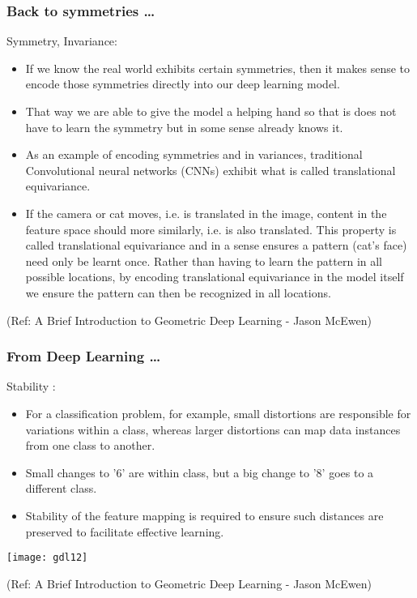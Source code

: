 \begin{frame}[fragile]\frametitle{Back to symmetries \ldots}

Symmetry, Invariance:

\begin{itemize}
\item If we know the real world exhibits certain symmetries, then it makes sense to encode those symmetries directly into our deep learning model.
\item That way we are able to give the model a helping hand so that is does not have to learn the symmetry but in some sense already knows it.
\item As an example of encoding symmetries and in variances, traditional Convolutional neural networks (CNNs) exhibit what is called translational equivariance.
\item If the camera or cat moves, i.e. is translated in the image, content in the feature space should more similarly, i.e. is also translated. This property is called translational equivariance and in a sense ensures a pattern (cat’s face) need only be learnt once. Rather than having to learn the pattern in all possible locations, by encoding translational equivariance in the model itself we ensure the pattern can then be recognized in all locations.
\end{itemize}

{\tiny (Ref: A Brief Introduction to Geometric Deep Learning - Jason McEwen)}

\end{frame}

\begin{frame}[fragile]\frametitle{From Deep Learning \ldots}

Stability :

\begin{itemize}
\item For a classification problem, for example, small distortions are responsible for variations within a class, whereas larger distortions can map data instances from one class to another. 
\item Small changes to '6' are within class, but a big change to '8' goes to a different class.
\item Stability of the feature mapping is required to ensure such distances are preserved to facilitate effective learning.
\end{itemize}

\begin{center}
\texttt{[image: gdl12]}
\end{center}

{\tiny (Ref: A Brief Introduction to Geometric Deep Learning - Jason McEwen)}

\end{frame}

